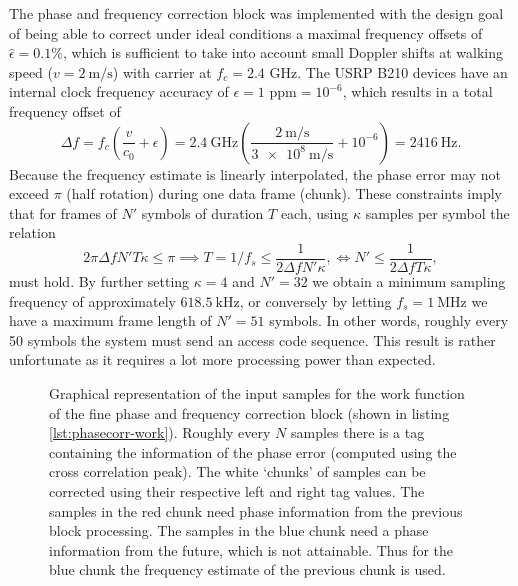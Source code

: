 The phase and frequency correction block was implemented with the design goal of being able to correct under ideal conditions a maximal frequency offsets of \(\hat{\epsilon} = 0.1\%\), which is sufficient to take into account small Doppler shifts at walking speed (\(v = \SI{2}{\meter\per\second}\)) with carrier at \(f_c = 2.4\) GHz. The USRP B210 devices have an internal clock frequency accuracy of \(\epsilon = 1\text{ ppm} = 10^{-6}\), which results in a total frequency offset of
\begin{equation}\label{eq:doppler}
	\Delta f = f_c \left( \frac{v}{c_0} + \epsilon \right)
	= \SI{2.4}{\giga\hertz} \left(
		\frac{\SI{2}{\meter\per\second}}{\SI{3e8}{\meter\per\second}} + 10^{-6} 
	\right) = \SI{2416}{\hertz}.
\end{equation}
Because the frequency estimate is linearly interpolated, the phase error may not exceed \(\pi\) (half rotation) during one data frame (chunk). These constraints imply that for frames of \(N'\) symbols of duration \(T\) each, using \(\kappa\) samples per symbol the relation
\begin{equation}\label{Doppler-shift}
	2\pi\Delta f N' T \kappa \leq \pi
	\implies T = 1/f_s \leq \frac{1}{2\Delta f N' \kappa},
	\iff N' \leq \frac{1}{2\Delta f T \kappa},
\end{equation}
must hold. By further setting \(\kappa = 4\) and \(N' = 32\) we obtain a minimum sampling frequency of approximately \(\SI{618.5}{\kilo\hertz}\), or conversely by letting \(f_s = \SI{1}{\mega\hertz}\) we have a maximum frame length of \(N' = 51\) symbols. In other words, roughly every 50 symbols the system must send an access code sequence. This result is rather unfortunate as it requires a lot more processing power than expected.

\begin{figure}
	\centering
	
	\caption{
		Graphical representation of the input samples for the work function of the fine phase and frequency correction block (shown in listing \ref{lst:phasecorr-work}). Roughly every \(N\) samples there is a tag containing the information of the phase error (computed using the cross correlation peak). The white `chunks' of samples can be corrected using their respective left and right tag values. The samples in the red chunk need phase information from the previous block processing. The samples in the blue chunk need a phase information from the future, which is not attainable. Thus for the blue chunk the frequency estimate of the previous chunk is used.
		\label{fig:phasecorr-chunks}
	}
\end{figure}



